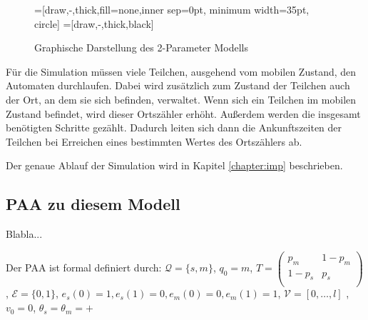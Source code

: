 \begin{figure}[h]
 \centering

\usetikzlibrary{arrows,%
                topaths}%
=[draw,-,thick,fill=none,inner sep=0pt, minimum width=35pt, circle]
=[draw,-,thick,black]
\usetikzlibrary{arrows,decorations.pathmorphing,backgrounds,positioning,fit}


\caption{Graphische Darstellung des 2-Parameter Modells}
\label{tikz:2p_Mod}
\end{figure}

Für die Simulation müssen viele Teilchen, ausgehend vom mobilen Zustand, den Automaten durchlaufen. Dabei wird zusätzlich zum Zustand der Teilchen auch der Ort, an dem sie sich befinden, verwaltet. Wenn sich ein Teilchen im mobilen Zustand befindet, wird dieser Ortszähler erhöht. Außerdem werden die insgesamt benötigten Schritte gezählt. Dadurch leiten sich dann die Ankunftszeiten der Teilchen bei Erreichen eines bestimmten Wertes des Ortszählers ab.

Der genaue Ablauf der Simulation wird in Kapitel \ref{chapter:imp} beschrieben.


\subsection{PAA zu diesem Modell}
Blabla...

Der PAA ist formal definiert durch: $\mathcal{Q} = \{s, m\}$, $q_0 = m$, $T =
 \begin{pmatrix}
  p_{m} & 1-p_{m}  \\
  1-p_{s} & p_{s} \\
 \end{pmatrix}$, $\mathcal{E} = \{0, 1\}$, $e_s(0) = 1, e_s(1)=0, e_m(0) = 0, e_m(1)=1$,
 $\mathcal{V} = [0, \ldots, l]$ , $v_0 = 0$, $\theta_s = \theta_m = + $

